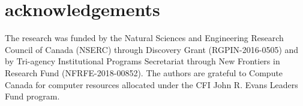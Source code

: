 \documentclass[journal=jacsat,manuscript=article]{achemso}
\begin{document}
\section{acknowledgements}

The research was funded by the Natural Sciences and Engineering Research Council of Canada (NSERC) through Discovery Grant (RGPIN-2016-0505) and by Tri-agency Institutional Programs Secretariat through New Frontiers in Research Fund (NFRFE-2018-00852). The authors are grateful to Compute Canada for computer resources allocated under the CFI John R. Evans Leaders Fund program.


\end{document}
